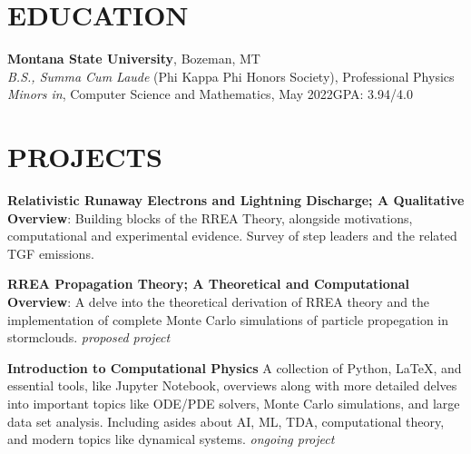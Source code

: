 \documentclass[margin]{res}
\begin{document}
\begin{resume}

\section{EDUCATION}
\textbf{Montana State University}, Bozeman, MT\\
{\sl B.S., Summa Cum Laude} (Phi Kappa Phi Honors Society), Professional Physics \\
{\sl Minors in}, Computer Science and Mathematics, May 2022\hfill GPA: 3.94/4.0\\



\section{PROJECTS}
\par
\textbf{Relativistic Runaway Electrons and Lightning Discharge; A Qualitative Overview}: 
Building blocks of the RREA Theory, alongside motivations, computational and experimental evidence. Survey of step leaders and the related TGF emissions.
\par
\textbf{RREA Propagation Theory; A Theoretical and Computational Overview}:
A delve into the theoretical derivation of RREA theory and the implementation of complete Monte Carlo simulations of particle propegation in stormclouds. \textit{proposed project}
\par 
\textbf{Introduction to Computational Physics}
A collection of Python, \LaTeX , and essential tools, like Jupyter Notebook, overviews along with more detailed delves into important topics like ODE/PDE solvers, Monte Carlo simulations, and large data set analysis. Including asides about AI, ML, TDA, computational theory, and modern topics like dynamical systems. \textit{ongoing project}



\end{resume}
\end{document}
